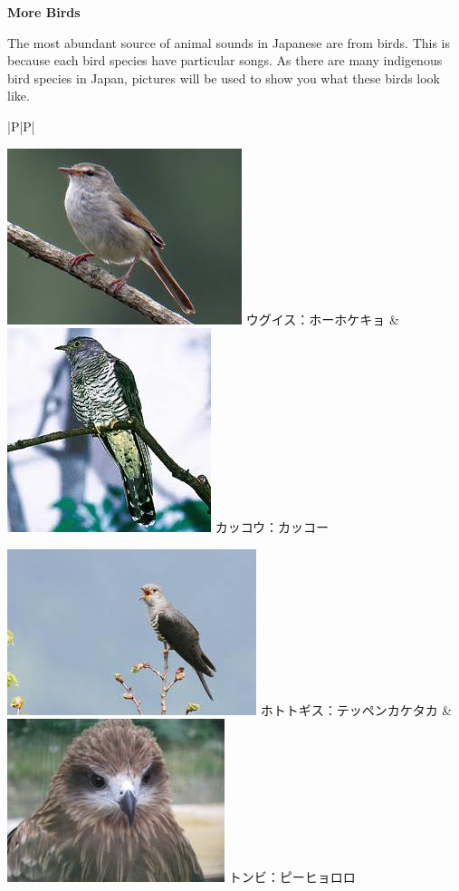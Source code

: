 \begin{center}
 \textbf{More Birds }
\end{center}

\par{ The most abundant source of animal sounds in Japanese are from birds. This is because each bird species have particular songs. As there are many indigenous bird species in Japan, pictures will be used to show you what these birds look like. }

\begin{ltabulary}{|P|P|}
\hline 

 
\includegraphics[scale=0.2]{figs/第04章/第157課:_onomatopoeiaii_fig/uguisu.png}
  ウグイス：ホーホケキョ 
&  
\includegraphics[scale=0.2]{figs/第04章/第157課:_onomatopoeiaii_fig/kakkoo.png}
 カッコウ：カッコー 
\\ 

 
\includegraphics[scale=0.2]{figs/第04章/第157課:_onomatopoeiaii_fig/hototogisu.png}
 ホトトギス：テッペンカケタカ 
&  
\includegraphics[scale=0.2]{figs/第04章/第157課:_onomatopoeiaii_fig/tonbi.png}
  トンビ：ピーヒョロロ 
\\ 

\end{ltabulary}
\hfill\break
    